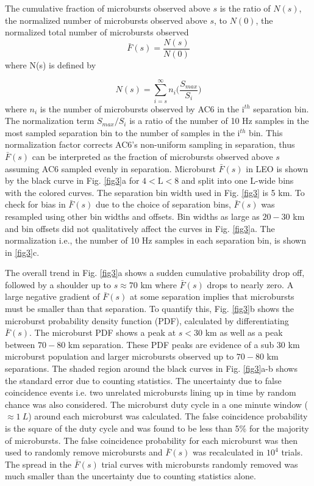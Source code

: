 \documentclass[draft]{agujournal2019}
\begin{document}
The cumulative fraction of microbursts observed above $s$ is the ratio of $N(s)$, the normalized number of microbursts observed above $s$, to $N(0)$, the normalized total number of microbursts observed 
\begin{equation} \label{Fs}
\bar{F}(s) = \frac{N(s)}{N(0)}
\end{equation} where N(s) is defined by

\begin{equation}
N(s) = \sum_{i = s}^\infty n_{i} \Big( \frac{S_{max}}{S_{i}} \Big)
\end{equation} where $n_{i}$ is the number of microbursts observed by AC6 in the i$^{th}$ separation bin. The normalization term $S_{max}/S_{i}$ is a ratio of the number of 10 Hz samples in the most sampled separation bin to the number of samples in the i$^{th}$ bin. This normalization factor corrects AC6's non-uniform sampling in separation, thus $\bar{F}(s)$ can be interpreted as the fraction of microbursts observed above $s$ assuming AC6 sampled evenly in separation. Microburst $\bar{F}(s)$ in LEO is shown by the black curve in Fig. \ref{fig3}a for $4 < \mathrm{L}< 8$ and split into one L-wide bins with the colored curves. The separation bin width used in Fig. \ref{fig3} is 5 km. To check for bias in $\bar{F}(s)$ due to the choice of separation bins, $\bar{F}(s)$ was resampled using other bin widths and offsets. Bin widths as large as $20-30$ km and bin offsets did not qualitatively affect the curves in Fig. \ref{fig3}a. The normalization i.e., the number of 10 Hz samples in each separation bin, is shown in \ref{fig3}c.

The overall trend in Fig. \ref{fig3}a shows a sudden cumulative probability drop off, followed by a shoulder up to $s \approx 70$ km where $\bar{F}(s)$ drops to nearly zero. A large negative gradient of $\bar{F}(s)$ at some separation implies that microbursts must be smaller than that separation. To quantify this, Fig. \ref{fig3}b shows the microburst probability density function (PDF), calculated by differentiating $\bar{F}(s)$. The microburst PDF shows a peak at $s < 30$ km as well as a peak between $70-80$ km separation. These PDF peaks are evidence of a sub $30$ km microburst population and larger microbursts observed up to $70-80$ km separations. The shaded region around the black curves in Fig. \ref{fig3}a-b shows the standard error due to counting statistics. The uncertainty due to false coincidence events i.e. two unrelated microbursts lining up in time by random chance was also considered. The microburst duty cycle in a one minute window ($\approx 1 \ L$) around each microburst was calculated. The false coincidence probability is the square of the duty cycle and was found to be less than 5\% for the majority of microbursts. The false coincidence probability for each microburst was then used to randomly remove microbursts and $\bar{F}(s)$ was recalculated in $10^4$ trials. The spread in the $\bar{F}(s)$ trial curves with microbursts randomly removed was much smaller than the uncertainty due to counting statistics alone.
\end{document}
